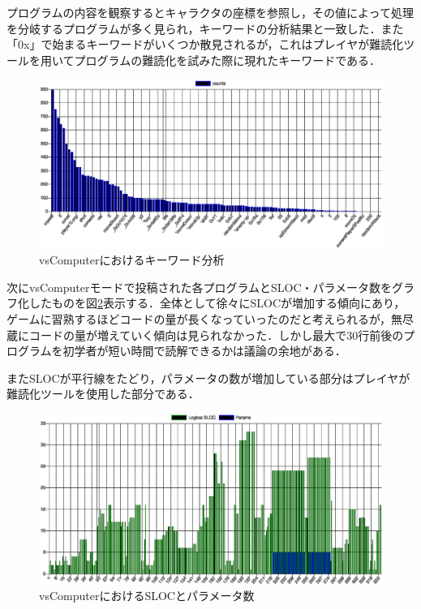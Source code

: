 プログラムの内容を観察するとキャラクタの座標を参照し，その値によって処理を分岐するプログラムが多く見られ，キーワードの分析結果と一致した．また「0x」で始まるキーワードがいくつか散見されるが，これはプレイヤが難読化ツールを用いてプログラムの難読化を試みた際に現れたキーワードである．

\begin{figure}[!ht]
  \begin{center}
    \includegraphics[width=1.0\linewidth]{image/vsComputer_result.eps}
  \end{center}
    \vspace{-8mm} 
  \caption{vsComputerにおけるキーワード分析}
  \label{vsComputer_keyword}
\end{figure}

次にvsComputerモードで投稿された各プログラムとSLOC・パラメータ数をグラフ化したものを図\ref{vsComputer_sloc_and_params}表示する．全体として徐々にSLOCが増加する傾向にあり，ゲームに習熟するほどコードの量が長くなっていったのだと考えられるが，無尽蔵にコードの量が増えていく傾向は見られなかった．しかし最大で30行前後のプログラムを初学者が短い時間で読解できるかは議論の余地がある．

またSLOCが平行線をたどり，パラメータの数が増加している部分はプレイヤが難読化ツールを使用した部分である．


\begin{figure}[!ht]
  \begin{center}
    \includegraphics[width=1.0\linewidth]{image/vsComputer_escomplex_SLOC_params.eps}
  \end{center}
    \vspace{-8mm} 
  \caption{vsComputerにおけるSLOCとパラメータ数}
  \label{vsComputer_sloc_and_params}
\end{figure}

